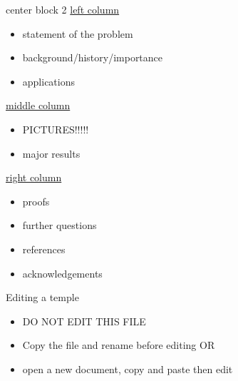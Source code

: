 \documentclass[leqno,presentation]{beamer}
\begin{document}
\begin{frame}
\begin{columns}[t]
\begin{column}{.45\linewidth}
\begin{block}{center block 2}
\underline{left column}
\begin{itemize}
 \item statement of the problem
\item background/history/importance
\item applications
\end{itemize}
\underline{middle column}
\begin{itemize}
 \item PICTURES!!!!!
\item  major results
\end{itemize}
\underline{right column}
\begin{itemize}
\item proofs
\item further questions
\item references
\item acknowledgements
\end{itemize}
\end{block}

\begin{block}{Editing a temple}
\begin{itemize}
\item DO NOT EDIT THIS FILE
\item Copy the file and rename before editing OR
\item open a new document, copy and paste then edit
\vspace{25ex}
\end{itemize}
\end{block}

\end{column}





\end{columns}
\end{frame}
\end{document}
